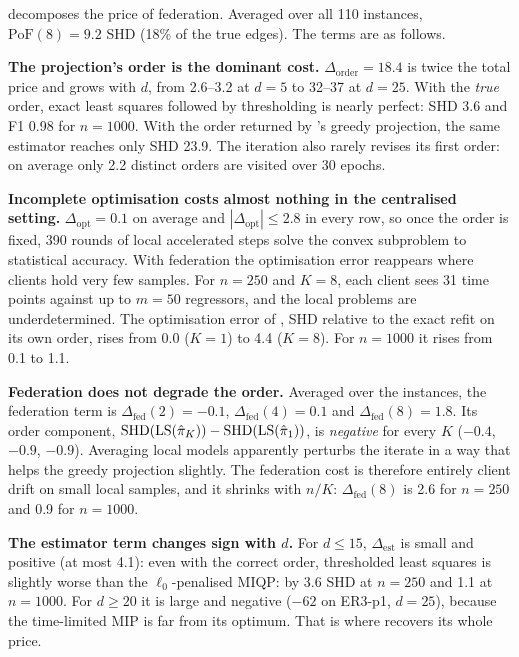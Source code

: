  decomposes the price of federation. Averaged over all 110 instances,
$\mathrm{PoF}(8)=9.2$ SHD (18\% of the true edges). The terms are as follows.

\textbf{The projection's order is the dominant cost.} $\Delta_{\mathrm{order}}=18.4$ is
twice the total price and grows with $d$, from 2.6--3.2 at $d=5$ to 32--37 at $d=25$. With
the \emph{true} order, exact least squares followed by thresholding is nearly perfect: SHD 3.6
and F1 0.98 for $n=1000$. With the order returned by \psidag's greedy projection, the same
estimator reaches only SHD 23.9. The iteration also rarely revises its first order: on
average only 2.2 distinct orders are visited over 30 epochs.

\textbf{Incomplete optimisation costs almost nothing in the centralised setting.}
$\Delta_{\mathrm{opt}}=0.1$ on average and $|\Delta_{\mathrm{opt}}|\le 2.8$ in every row, so
once the order is fixed, 390 rounds of local accelerated steps solve the convex subproblem to
statistical accuracy. With federation the optimisation error reappears where clients hold
very few samples. For $n=250$ and $K=8$, each client sees 31 time points against up to $m=50$
regressors, and the local problems are underdetermined. The optimisation error of \feddbn{},
SHD relative to the exact refit on its own order, rises from 0.0 ($K=1$) to 4.4 ($K=8$). For
$n=1000$ it rises from 0.1 to 1.1.

\textbf{Federation does not degrade the order.} Averaged over the instances, the federation
term is $\Delta_{\mathrm{fed}}(2)=-0.1$, $\Delta_{\mathrm{fed}}(4)=0.1$ and
$\Delta_{\mathrm{fed}}(8)=1.8$. Its order component,
$\mathrm{SHD}(\mathrm{LS}(\hat\pi_K))-\mathrm{SHD}(\mathrm{LS}(\hat\pi_1))$, is \emph{negative} for every
$K$ ($-0.4$, $-0.9$, $-0.9$). Averaging local models apparently perturbs the iterate in a
way that helps the greedy projection slightly. The federation cost is therefore entirely
client drift on small local samples, and it shrinks with $n/K$: $\Delta_{\mathrm{fed}}(8)$
is 2.6 for $n=250$ and 0.9 for $n=1000$.

\textbf{The estimator term changes sign with $d$.} For $d\le 15$, $\Delta_{\mathrm{est}}$ is
small and positive (at most 4.1): even with the correct order, thresholded least squares is
slightly worse than the $\ell_0$-penalised MIQP: by 3.6 SHD at $n=250$ and 1.1 at $n=1000$. For $d\ge 20$ it is large
and negative ($-62$ on ER3-p1, $d=25$), because the time-limited MIP is far from its optimum.
That is where \feddbn{} recovers its whole price.

